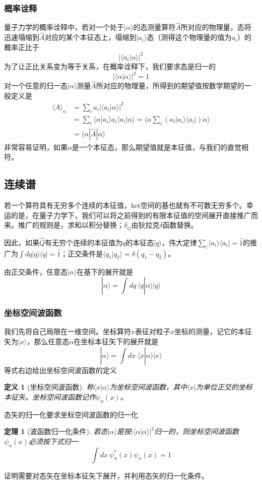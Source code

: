 \documentclass[a4paper,11pt]{ctexart}
\newcommand{\beq}{\begin{equation}}
\newcommand{\eeq}{\end{equation}}
\newcommand{\bea}{\begin{equation}\begin{aligned}}
\newcommand{\eea}{\end{aligned}\end{equation}}
\newtheorem{thm}{定理}[section]
\newtheorem{dfn}{定义}[section]
\begin{document}
\subsubsection{概率诠释}
量子力学的概率诠释中，若对一个处于$|\alpha \rangle$的态测量算符$\hat{A}$所对应的物理量，态将迅速塌缩到$\hat{A}$对应的某个本征态上，塌缩到$| a_i \rangle$态（测得这个物理量的值为$a_i$）的概率正比于
\beq
| \langle a_i | \alpha \rangle |^2 
\eeq
为了让正比关系变为等于关系，在概率诠释下，我们要求态是归一的
\beq
| \langle \alpha | \alpha \rangle |^2 = 1
\eeq
对一个任意的归一态$| \alpha \rangle$测量$\hat{A}$所对应的物理量，所得到的期望值按数学期望的一般定义是
\bea
\langle A \rangle_\alpha &= \sum_i a_i | \langle a_i | \alpha \rangle |^2  \\
&= \sum_i \langle \alpha | a_i \rangle a_i \langle a_i | \alpha \rangle = \langle \alpha \sum_i(a_i | a_i \rangle \langle a_i |) \alpha \rangle \\
&= \langle \alpha | \hat{A} | \alpha \rangle
\eea
非常容易证明，如果$\alpha$是一个本征态，那么期望值就是本征值，与我们的直觉相符。

\subsection{连续谱}
若一个算符具有无穷多个连续的本征值，ket空间的基也就有不可数无穷多个。幸运的是，在量子力学下，我们可以将之前得到的有限本征值的空间展开直接推广而来。推广的规则是，求和以积分替换；$\delta_{ij}$由狄拉克$\delta$函数替换。
\par
因此，如果$\hat{Q}$有无穷个连续的本征值为$q$的本征态$| q \rangle$，伟大定律$\sum_i | a_i \rangle \langle a_i | = \hat{1}$的推广为$\int dq | q \rangle \langle q | = \hat{1}$；正交条件是$\langle q_1 | q_2 \rangle = \delta(q_1 - q_2)$。\par
由正交条件，任意态$|\alpha \rangle $在基下的展开就是
\beq
| \alpha \rangle = \int dq\ \langle q | \alpha \rangle | q \rangle
\eeq
\subsubsection{坐标空间波函数}
我们先将自己局限在一维空间。坐标算符$\hat{x}$表征对粒子$x$坐标的测量，记它的本征矢为$| x \rangle$，那么任意态$\alpha$在坐标本征矢下的展开就是
\beq
| \alpha \rangle = \int dx\ \langle x | \alpha \rangle | x \rangle
\eeq
等式右边给出坐标空间波函数的定义
\begin{dfn}[坐标空间波函数]
称$\langle x | \alpha \rangle$为坐标空间波函数，其中$\langle x |$为单位正交的坐标本征矢。坐标空间波函数记作$\psi_\alpha (x)$。
\end{dfn}
态矢的归一化要求坐标空间波函数的归一化
\begin{thm}[波函数归一化条件]
若态$| \alpha \rangle$是按$| \langle \alpha | \alpha \rangle |^2$归一的，则坐标空间波函数$\psi_\alpha (x)$必须按下式归一
\beq
\int dx\ \psi_\alpha^* (x) \psi_\alpha (x) = 1
\eeq
\end{thm}
证明需要对态矢在坐标本征矢下展开，并利用态矢的归一化条件。
\end{document}
